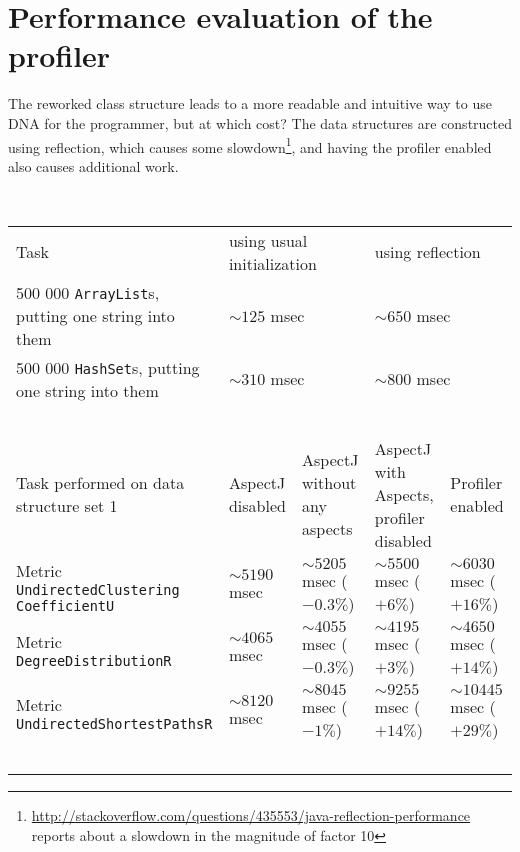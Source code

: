 \section{Performance evaluation of the profiler} \label{sec:performance}
	The reworked class structure leads to a more readable and intuitive way to use DNA for
	the programmer, but at which cost? The data structures are constructed using reflection,
	which causes some
	slowdown\footnote{\url{http://stackoverflow.com/questions/435553/java-reflection-performance}
	reports about a slowdown in the magnitude of factor 10}, and having the profiler
	enabled also causes additional work. 
	
	\ \\ 	
	\begin{sidewaystable}
		\begin{tabular}{lllll}
			Task & \multicolumn{2}{l}{using usual initialization} & \multicolumn{2}{l}{using
			reflection} \\
		    500 000 \texttt{ArrayList}s, putting one string into them & 
		    	\multicolumn{2}{l}{$\sim 125$ msec} & \multicolumn{2}{l}{$\sim 650$ msec} \\
		    500 000 \texttt{HashSet}s, putting one string into them  &
		    	\multicolumn{2}{l}{$\sim 310$ msec} & \multicolumn{2}{l}{$\sim 800$ msec} \\
			~ & \\
			Task performed on data structure set 1 & AspectJ disabled & AspectJ without any
			aspects & AspectJ with Aspects, profiler disabled & Profiler enabled \\
	    	Metric \texttt{Undirected\allowbreak Clustering\allowbreak
				CoefficientU} & $\sim 5190$ msec & $\sim 5205$ msec ($- 0.3\%$) & $\sim 5500$ msec ($+
				6\%$) & $\sim 6030$ msec ($+ 16\%$) \\
			Metric \texttt{Degree\allowbreak DistributionR} &
				$\sim 4065$ msec & $\sim 4055$ msec ($- 0.3\%$) & $\sim 4195$ msec ($+
				3\%$) & $\sim 4650$ msec ($+ 14\%$) \\
			Metric \texttt{Undirected\allowbreak Shortest\allowbreak PathsR} &
				$\sim 8120$ msec & $\sim 8045$ msec ($- 1\%$) & $\sim 9255$ msec ($+
				14\%$) & $\sim 10445$ msec ($+ 29\%$) \\
			~ & \\
			

\end{tabular}
\end{sidewaystable}
